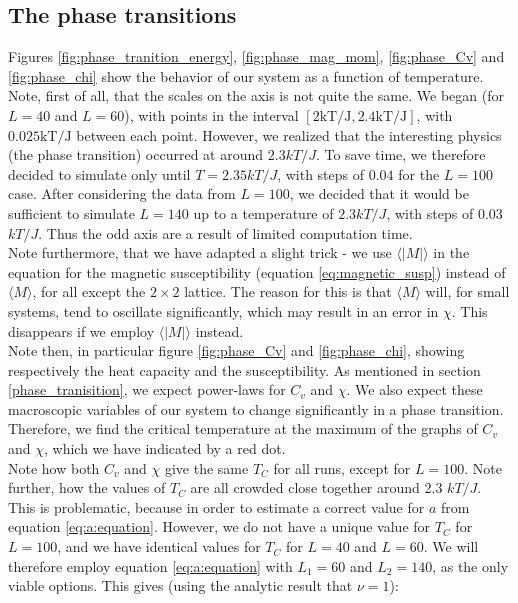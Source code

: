 \documentclass[a4paper, 10pt]{article}
\begin{document}
\subsection{The phase transitions}\label{discussion_phase_transition}
Figures \ref{fig:phase_tranition_energy}, \ref{fig:phase_mag_mom}, \ref{fig:phase_Cv} and \ref{fig:phase_chi} show the behavior of our system as a function of temperature. Note, first of all, that the scales on the axis is not quite the same. We began (for $L=40$ and $L=60$), with points in the interval $[2\mathrm{kT/J}, 2.4\mathrm{kT/J}]$, with $0.025 \mathrm{kT/J}$ between each point. However, we realized that the interesting physics (the phase transition) occurred at around $2.3 kT/J$. To save time, we therefore decided to simulate only until $T=2.35 kT/J$, with steps of $0.04$ for the $L=100$ case. After considering the data from $L=100$, we decided that it would be sufficient to simulate $L=140$ up to a temperature of $2.3 kT/J$, with steps of 0.03 $kT/J$. Thus the odd axis are a result of limited computation time.\\
\linebreak
Note furthermore, that we have adapted a slight trick - we use $\langle |M|\rangle$ in the equation for the magnetic susceptibility (equation \ref{eq:magnetic_susp}) instead of $\langle M \rangle$, for all except the $2 \times 2$ lattice. The reason for this is that $\langle M \rangle$ will, for small systems, tend to oscillate significantly, which may result in an error in $\chi$. This disappears if we employ $\langle |M|\rangle$ instead.\\
\linebreak
Note then, in particular figure \ref{fig:phase_Cv} and \ref{fig:phase_chi}, showing respectively the heat capacity and the susceptibility. As mentioned in section \ref{phase_tranisition}, we expect power-laws for $C_v$ and $\chi$. We also expect these macroscopic variables  of our system to change significantly in a phase transition. Therefore, we find the critical temperature at the maximum of the graphs of $C_v$ and $\chi$, which we have indicated by a red dot.\\
\linebreak
Note how both $C_v$ and $\chi$ give the same $T_C$ for all runs, except for $L=100$. Note further, how the values of $T_C$ are all crowded close together around 2.3 $kT/J$. This is problematic, because in order to estimate a correct value for $a$ from equation \ref{eq:a:equation}. However, we do not have a unique value for $T_C$ for $L=100$, and we have identical values for $T_C$ for $L=40$ and $L=60$. We will therefore employ equation \ref{eq:a:equation} with $L_1=60$ and $L_2=140$, as the only viable options. This gives (using the analytic result that $\nu = 1$):
\end{document}
